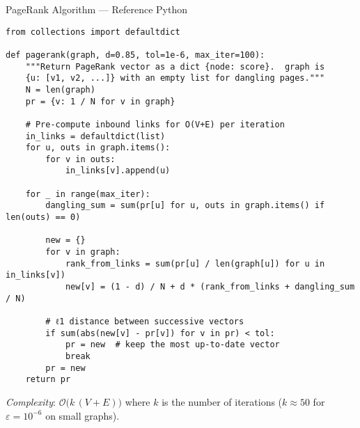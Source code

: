 \documentclass{beamer}
\begin{document}
\begin{frame}[fragile]{PageRank Algorithm — Reference Python}
\vspace{-0.7em}
\begin{verbatim}
from collections import defaultdict

def pagerank(graph, d=0.85, tol=1e-6, max_iter=100):
    """Return PageRank vector as a dict {node: score}.  graph is
    {u: [v1, v2, ...]} with an empty list for dangling pages."""
    N = len(graph)
    pr = {v: 1 / N for v in graph}

    # Pre-compute inbound links for O(V+E) per iteration
    in_links = defaultdict(list)
    for u, outs in graph.items():
        for v in outs:
            in_links[v].append(u)

    for _ in range(max_iter):
        dangling_sum = sum(pr[u] for u, outs in graph.items() if len(outs) == 0)

        new = {}
        for v in graph:
            rank_from_links = sum(pr[u] / len(graph[u]) for u in in_links[v])
            new[v] = (1 - d) / N + d * (rank_from_links + dangling_sum / N)

        # ℓ1 distance between successive vectors
        if sum(abs(new[v] - pr[v]) for v in pr) < tol:
            pr = new  # keep the most up‑to‑date vector
            break
        pr = new
    return pr
\end{verbatim}
\vspace{-0.3em}
\textit{Complexity}: $\mathcal{O}\big(k\,(V+E)\big)$ where $k$ is the number of iterations (\(k\approx50\) for $\varepsilon=10^{-6}$ on small graphs).
\end{frame}
\end{document}
